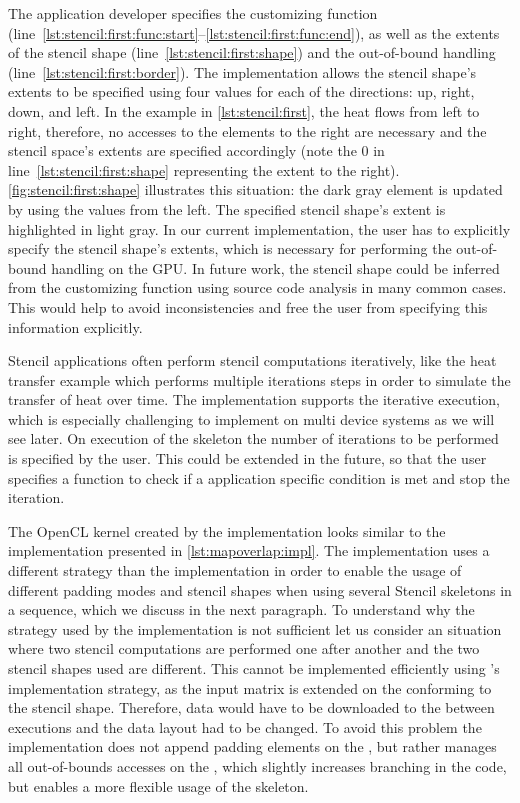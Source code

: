 The application developer specifies the customizing function (line~\ref{lst:stencil:first:func:start}--\ref{lst:stencil:first:func:end}), as well as the extents of the stencil shape (line~\ref{lst:stencil:first:shape}) and the out-of-bound handling (line~\ref{lst:stencil:first:border}).
The  implementation allows the stencil shape's extents to be specified using four values for each of the directions:
up, right, down, and left.
In the example in \autoref{lst:stencil:first}, the heat flows from left to right, therefore, no accesses to the elements to the right are necessary and the stencil space's extents are specified accordingly (note the $0$ in line~\ref{lst:stencil:first:shape} representing the extent to the right).
\autoref{fig:stencil:first:shape} illustrates this situation: the dark gray element is updated by using the values from the left.
The specified stencil shape's extent is highlighted in light gray.
In our current implementation, the user has to explicitly specify the stencil shape's extents, which is necessary for performing the out-of-bound handling on the GPU.
In future work, the stencil shape could be inferred from the customizing function using source code analysis in many common cases.
This would help to avoid inconsistencies and free the user from specifying this information explicitly.

Stencil applications often perform stencil computations iteratively, like the heat transfer example which performs multiple iterations steps in order to simulate the transfer of heat over time.
The  implementation supports the iterative execution, which is especially challenging to implement on multi device systems as we will see later.
On execution of the skeleton the number of iterations to be performed is specified by the user.
This could be extended in the future, so that the user specifies a function to check if a application specific condition is met and stop the iteration.

The OpenCL kernel created by the  implementation looks similar to the  implementation presented in \autoref{lst:mapoverlap:impl}.
The  implementation uses a different strategy than the  implementation in order to enable the usage of different padding modes and stencil shapes when using several Stencil skeletons in a sequence, which we discuss in the next paragraph.
To understand why the strategy used by the  implementation is not sufficient let us consider an situation where two stencil computations are performed one after another and the two stencil shapes used are different.
This cannot be implemented efficiently using 's implementation strategy, as the input matrix is extended on the \CPU conforming to the stencil shape.
Therefore, data would have to be downloaded to the \CPU between executions and the data layout had to be changed.
To avoid this problem the  implementation does not append padding elements on the \CPU, but rather manages all out-of-bounds accesses on the \GPU, which slightly increases branching in the code, but enables a more flexible usage of the skeleton.


